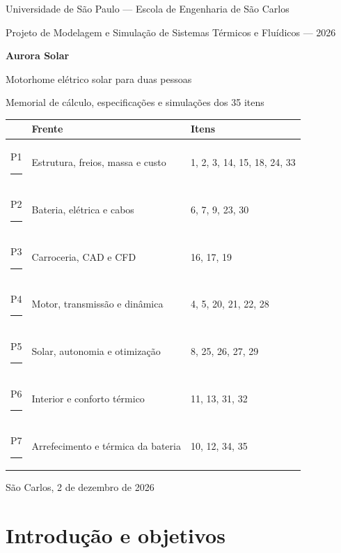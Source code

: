 \documentclass[11pt,a4paper]{article}
\begin{document}
\begin{titlepage}
\centering
{\large Universidade de São Paulo — Escola de Engenharia de São Carlos\par}
{\large Projeto de Modelagem e Simulação de Sistemas Térmicos e Fluídicos — 2026\par}
\vspace{3cm}
{\Huge\bfseries Aurora Solar\par}
\vspace{0.6cm}
{\Large Motorhome elétrico solar para duas pessoas\par}
\vspace{0.4cm}
{\large Memorial de cálculo, especificações e simulações dos 35 itens\par}
\vspace{2.5cm}
\begin{tabular}{lll}
\toprule
& Frente & Itens \\
\midrule
P1 \hspace{1em}\rule{4cm}{0.4pt} & Estrutura, freios, massa e custo & 1, 2, 3, 14, 15, 18, 24, 33 \\
P2 \hspace{1em}\rule{4cm}{0.4pt} & Bateria, elétrica e cabos & 6, 7, 9, 23, 30 \\
P3 \hspace{1em}\rule{4cm}{0.4pt} & Carroceria, CAD e CFD & 16, 17, 19 \\
P4 \hspace{1em}\rule{4cm}{0.4pt} & Motor, transmissão e dinâmica & 4, 5, 20, 21, 22, 28 \\
P5 \hspace{1em}\rule{4cm}{0.4pt} & Solar, autonomia e otimização & 8, 25, 26, 27, 29 \\
P6 \hspace{1em}\rule{4cm}{0.4pt} & Interior e conforto térmico & 11, 13, 31, 32 \\
P7 \hspace{1em}\rule{4cm}{0.4pt} & Arrefecimento e térmica da bateria & 10, 12, 34, 35 \\
\bottomrule
\end{tabular}
\vfill
{São Carlos, 2 de dezembro de 2026\par}
\end{titlepage}

\tableofcontents
\clearpage

\section{Introdução e objetivos}
\end{document}
